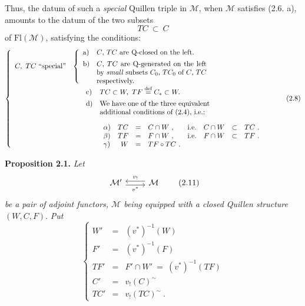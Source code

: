 \documentclass[11pt]{article}
\newcommand{\printedpage}[1]{\marginpar{\footnotesize p.~#1}}
\newcommand{\msp}[1]{\marginpar{\footnotesize [#1]}}
\newcommand{\M}{\mathcal{M}}
\newcommand{\Fl}{\mathrm{Fl}}
\begin{document}
Thus, the datum of such a \textit{special} Quillen triple in $\M$, when $\M$ satisfies (2.6. a), amounts to the datum of the two subsets
\msp{page 15}
\[
TC \ \subset\ C
\tag*{(2.7)}
\]
of $\Fl(\M)$, satisfying the conditions:
\[
\left\{
\begin{array}{ll}
C,\ TC\ \text{``special''} &
\left\{\begin{array}{ll}
\text{a)} & \text{$C$, $TC$ are Q-closed on the left.}\\[1ex]
\text{b)} & \parbox[t]{0.45\textwidth}{$C$, $TC$ are Q-generated on the left by \textit{small} subsets $C_0$, $TC_0$ of $C$, $TC$ respectively.}
\end{array}\right.\\[5ex]
 & \quad\ \begin{array}{ll}
\text{c)} & TC \subset W,\ TF \overset{\text{def}}{=} C_* \subset W.\\[1ex]
\text{d)} & \parbox[t]{0.45\textwidth}{We have one of the three equivalent additional conditions of (2.4), i.e.:}\\[5ex]
 & \begin{array}{lrcllrcl}
\alpha) & TC & = & C \cap W\ , & \text{i.e.} & C \cap W & \subset & TC\ .\\
\beta) & TF & = & F \cap W\ , & \text{i.e.} & F \cap W & \subset & TF\ .\\
\gamma) & W & = & TF \circ TC\ . & & & &
\end{array}
\end{array}
\end{array}\right.
\tag*{(2.8)}
\]

\printedpage{10}

\textbf{Proposition 2.1.} \textit{Let}
\[
\begin{tikzcd}
\M' \arrow[r, shift right, "v^*"'] & \M \arrow[l, shift right, "v_!"']
\end{tikzcd}
\tag*{(2.11)} %
\]
\textit{be a pair of adjoint functors, $\M$ being equipped with a closed Quillen structure} $(W,C,F)$. \textit{Put}
\[
\left\{
\begin{array}{rcl}
W' & = & (v^*)^{-1}(W)\\
F' & = & (v^*)^{-1}(F)\\
TF' & = & F' \cap W' \ = \ (v^*)^{-1}(TF)\\
C' & = & v_!(C)^{\sim}\\
TC' & = & v_!(TC)^{\sim}\ .
\end{array}\right.
\tag*{(2.1.2)}
\]
\end{document}

